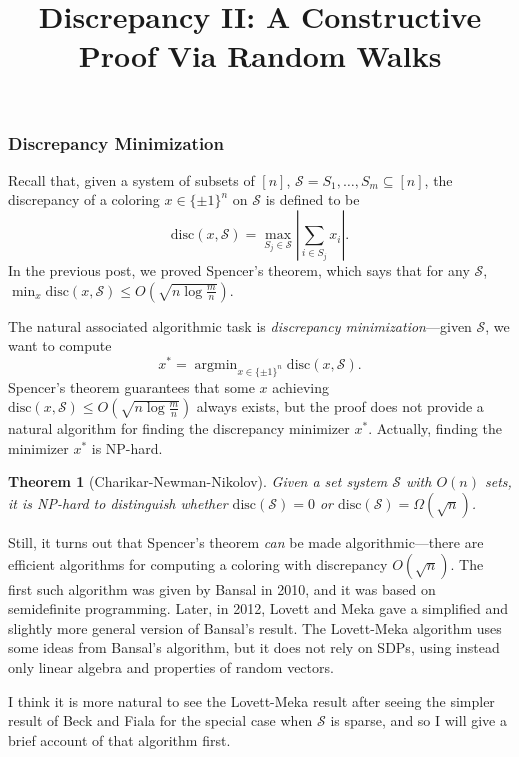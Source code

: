 \documentclass{article}
\title{Discrepancy II: A Constructive Proof Via Random Walks}
\date{}
\theoremstyle{theorem}
\newtheorem{theorem}{Theorem}
\theoremstyle{definition}
\newcommand{\disc}{\mathrm{disc}}
\newcommand{\cS}{\mathcal{S}}
\newcommand{\argmin}{\mathop{\mathrm{argmin}}}
\begin{document}
\maketitle


\subsubsection*{Discrepancy Minimization}
Recall that, given a system of subsets of $[n]$, $\cS = S_1,\ldots,S_m \subseteq [n]$, the discrepancy of a coloring $x \in \{\pm 1\}^n$ on $\cS$ is defined to be
\[
    \disc(x,\cS) = \max_{S_j \in \cS} \left|\sum_{i \in S_j} x_i\right|.
\]
In the previous post, we proved Spencer's theorem, which says that for any $\cS$, $\min_{x}\disc(x,\cS) \le O(\sqrt{n\log\frac{m}{n}})$.

The natural associated algorithmic task is \emph{discrepancy minimization}---given $\cS$, we want to compute
\[
    x^* = \argmin_{x \in \{\pm 1\}^n} \disc(x,\cS).
\]
Spencer's theorem guarantees that some $x$ achieving $\disc(x,\cS) \le O(\sqrt{n\log\frac{m}{n}})$ always exists, but the proof does not provide a natural algorithm for finding the discrepancy minimizer $x^*$.
Actually, finding the minimizer $x^*$ is NP-hard.
\begin{theorem}[Charikar-Newman-Nikolov]
    Given a set system $\cS$ with $O(n)$ sets, it is NP-hard to distinguish whether $\disc(\cS) = 0$ or $\disc(\cS) = \Omega(\sqrt{n})$.
\end{theorem}

Still, it turns out that Spencer's theorem \emph{can} be made algorithmic---there are efficient algorithms for computing a coloring with discrepancy $O(\sqrt{n})$.
The first such algorithm was given by Bansal in 2010, and it was based on semidefinite programming.
Later, in 2012, Lovett and Meka gave a simplified and slightly more general version of Bansal's result.
The Lovett-Meka algorithm uses some ideas from Bansal's algorithm, but it does not rely on SDPs, using instead only linear algebra and properties of random vectors.

I think it is more natural to see the Lovett-Meka result after seeing the simpler result of Beck and Fiala for the special case when $\cS$ is sparse, and so I will give a brief account of that algorithm first.
\end{document}

